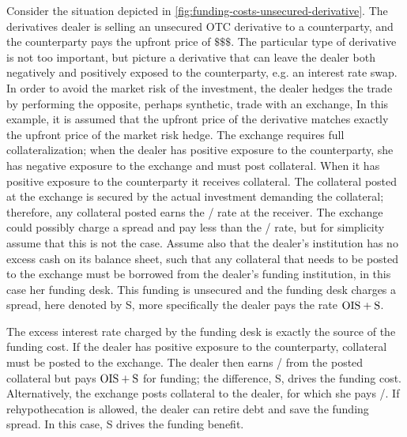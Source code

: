 \documentclass[main.tex]{subfiles}
\begin{document}
        \begin{example}
        Consider the situation depicted in \cref{fig:funding-costs-unsecured-derivative}.
        The derivatives dealer is selling an unsecured OTC derivative to a counterparty,
        and the counterparty pays the upfront price of $\$\$\$$.
        The particular type of derivative is not too important, 
        but picture a derivative that can leave the dealer both negatively and positively exposed to the counterparty, 
        e.g. an interest rate swap.
        In order to avoid the market risk of the investment, 
        the dealer hedges the trade by performing the opposite, 
        perhaps synthetic, trade with an exchange,
        In this example, it is assumed that the upfront price of the derivative 
        matches exactly the upfront price of the market risk hedge.
        The exchange requires full collateralization;
        when the dealer has positive exposure to the counterparty, 
        she has negative exposure to the exchange and must post collateral. 
        When it has positive exposure to the counterparty it receives collateral.
        The collateral posted at the exchange is secured by the actual investment demanding the collateral;
        therefore, any collateral posted earns the \OIS/ rate at the receiver.
        The exchange could possibly charge a spread and pay less than the \OIS/ rate,
        but for simplicity assume that this is not the case.
        Assume also that the dealer's institution has no excess cash on its balance sheet, 
        such that any collateral that needs to be posted to the exchange 
        must be borrowed from the dealer's funding institution,
        in this case her funding desk. 
        This funding is unsecured and the funding desk charges a spread, here denoted by S,
        more specifically the dealer pays the rate $\OIS/ + \text{S}$.

        The excess interest rate charged by the funding desk is exactly the source of the funding cost.
        If the dealer has positive exposure to the counterparty, collateral must be posted to the exchange.
        The dealer then earns \OIS/ from the posted collateral but pays $\OIS/ + \text{S}$ for funding;
        the difference, S, drives the funding cost.
        Alternatively, the exchange posts collateral to the dealer, for which she pays \OIS/.
        If rehypothecation is allowed, the dealer can retire debt and save the funding spread.
        In this case, S drives the funding benefit.
        \end{example}
\end{document}
